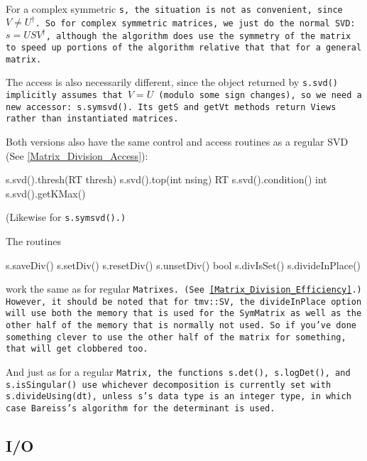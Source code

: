 \begin{enumerate}
For a complex symmetric \tt{s}, the situation is not as convenient,
since $V \neq U^\dagger$.
So for complex symmetric matrices, we
just do the normal SVD: $s = USV^\dagger$, although the algorithm
does use the symmetry of the matrix to 
speed up portions of the algorithm relative that that for a general matrix.

The access is also necessarily different, since the object returned by 
\tt{s.svd()} implicitly assumes that $V = U$ (modulo some sign changes), 
so we need a 
new accessor: \tt{s.symsvd()}.  Its \tt{getS} and \tt{getVt} methods return Views
rather than instantiated matrices.

Both versions also have the same control and access routines as a regular SVD
(See \ref{Matrix_Division_Access}):
\begin{tmvcode}
s.svd().thresh(RT thresh)
s.svd().top(int nsing)
RT s.svd().condition()
int s.svd().getKMax()
\end{tmvcode}
(Likewise for \tt{s.symsvd()}.)

\end{enumerate}
The routines 
\begin{tmvcode}
s.saveDiv()
s.setDiv()
s.resetDiv()
s.unsetDiv()
bool s.divIsSet()
s.divideInPlace()
\end{tmvcode}
work the same as for regular \tt{Matrix}es.
(See \ref{Matrix_Division_Efficiency}.)  However, it should be noted that
for \tt{tmv::SV}, the \tt{divideInPlace} option will use both the memory
that is used for the \tt{SymMatrix} as well as the other half of the 
memory that is normally not used.  So if you've done something clever 
to use the other half of the matrix for something, that will get 
clobbered too.

And just as for a regular \tt{Matrix}, the functions \tt{s.det()}, \tt{s.logDet()}, and \tt{s.isSingular()} use whichever decomposition is currently set with \tt{s.divideUsing(dt)},
unless \tt{s}'s data type is an integer type, in which case Bareiss's algorithm for the determinant
is used.

\subsection{I/O}
\label{SymMatrix_IO}

